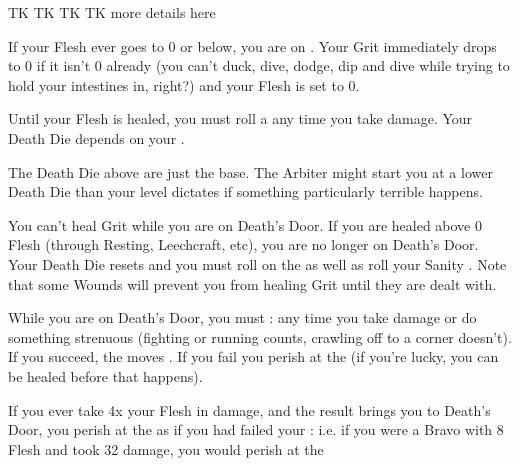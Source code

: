 {  TK TK TK TK more details here



  If your Flesh ever goes to 0 or below, you are on  .  Your Grit immediately drops to 0 if it isn't 0 already (you can't duck, dive, dodge, dip and dive while trying to hold your intestines in, right?) and your Flesh is set to 0.

  Until your Flesh is healed, you must roll a \DEATH any time you take damage.  Your Death Die depends on your \LVL.


  The Death Die above are just the base. The Arbiter might start you at a lower Death Die than your level dictates if something particularly terrible happens. 

  You can't heal Grit while you are on Death's Door.  If you are healed above 0 Flesh (through Resting, Leechcraft, etc), you are no longer on Death's Door.  Your Death Die resets and you must roll on the  as well as roll your Sanity \UD.  Note that some Wounds will prevent you from healing Grit until they are dealt with.



  While you are on Death's Door, you must \RS : \DEATH any time you take damage or do something strenuous (fighting or running counts, crawling off to a corner doesn't). If you succeed, the \DEATH moves \DCDOWN. If you fail you perish at the  (if you're lucky, you can be healed before that happens).


  If you ever take 4x your \MAX Flesh in damage, and the result brings you to Death's Door, you perish at the  as if you had failed your \RS : \DEATH i.e. if you were a Bravo with 8 Flesh and took 32 damage, you would perish at the 


}
